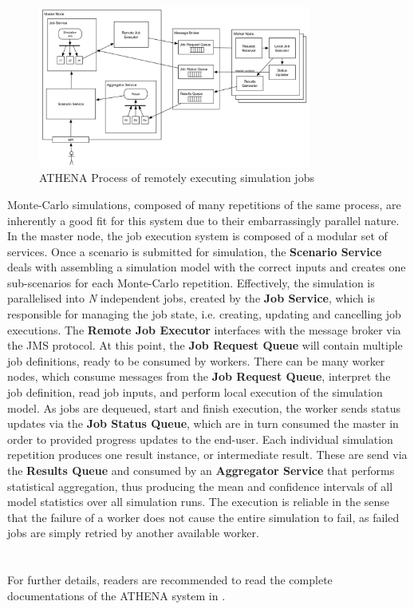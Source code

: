 \begin{figure}
\centering
\includegraphics[width=0.8\textwidth]{Figures/ATHENA_remote_job_exec}
\decoRule
\caption[ATHENA Remote Job Execution]{ATHENA Process of remotely executing simulation jobs}
\label{fig:remoteJob}
\end{figure}

Monte-Carlo simulations, composed of many repetitions of the same process, are inherently a good fit for this system due to their embarrassingly parallel nature. 
In the master node, the job execution system is composed of a modular set of services. Once a scenario is submitted for simulation, the \textbf{Scenario Service} deals with assembling a simulation model with the correct inputs and creates one sub-scenarios for each Monte-Carlo repetition. Effectively, the simulation is parallelised into \textit{N} independent jobs, created by the \textbf{Job Service}, which is responsible for managing the job state, i.e. creating, updating and cancelling job executions. The \textbf{Remote Job Executor} interfaces with the message broker via the JMS protocol. At this point, the \textbf{Job Request Queue} will contain multiple job definitions, ready to be consumed by workers. 
There can be many worker nodes, which consume messages from the \textbf{Job Request Queue}, interpret the job definition, read job inputs, and perform local execution of the simulation model. As jobs are dequeued, start and finish execution, the worker sends status updates via the \textbf{Job Status Queue}, which are in turn consumed the master in order to provided progress updates to the end-user. Each individual simulation repetition produces one result instance, or intermediate result. These are send via the \textbf{Results Queue} and consumed by an \textbf{Aggregator Service} that performs statistical aggregation, thus producing the mean and confidence intervals of all model statistics over all simulation runs. The execution is reliable in the sense that the failure of a worker does not cause the entire simulation to fail, as failed jobs are simply retried by another available worker. 
\\
\\
\\
For further details, readers are recommended to read the complete documentations of the ATHENA system in \parencite{athenaAllDoc}.
